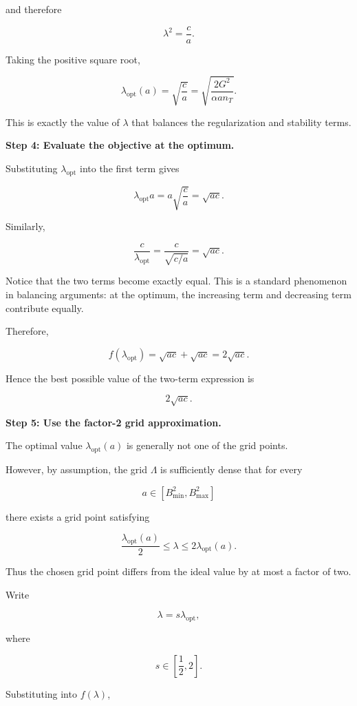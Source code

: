 \documentclass[11pt]{article}
\begin{document}
\begin{enumerate}
\begin{solutionbox}
and therefore

\[
\lambda^2
=
\frac{c}{a}.
\]

Taking the positive square root,

\[
\lambda_{\mathrm{opt}}(a)
=
\sqrt{\frac{c}{a}}
=
\sqrt{
\frac{2G^2}
{\alpha a n_T}
}.
\]

This is exactly the value of $\lambda$ that balances the regularization and stability terms.

\medskip

\textbf{Step 4: Evaluate the objective at the optimum.}

Substituting $\lambda_{\mathrm{opt}}$ into the first term gives

\[
\lambda_{\mathrm{opt}}a
=
a\sqrt{\frac{c}{a}}
=
\sqrt{ac}.
\]

Similarly,

\[
\frac{c}{\lambda_{\mathrm{opt}}}
=
\frac{c}{\sqrt{c/a}}
=
\sqrt{ac}.
\]

Notice that the two terms become exactly equal. This is a standard phenomenon in balancing arguments: at the optimum, the increasing term and decreasing term contribute equally.

Therefore,

\[
f(\lambda_{\mathrm{opt}})
=
\sqrt{ac}
+
\sqrt{ac}
=
2\sqrt{ac}.
\]

Hence the best possible value of the two-term expression is

\[
2\sqrt{ac}.
\]

\medskip

\textbf{Step 5: Use the factor-2 grid approximation.}

The optimal value $\lambda_{\mathrm{opt}}(a)$ is generally not one of the grid points.

However, by assumption, the grid $\Lambda$ is sufficiently dense that for every

\[
a\in[B_{\min}^2,B_{\max}^2]
\]

there exists a grid point satisfying

\[
\frac{\lambda_{\mathrm{opt}}(a)}{2}
\le
\lambda
\le
2\lambda_{\mathrm{opt}}(a).
\]

Thus the chosen grid point differs from the ideal value by at most a factor of two.

Write

\[
\lambda
=
s\lambda_{\mathrm{opt}},
\]

where

\[
s\in\left[\frac12,2\right].
\]

Substituting into $f(\lambda)$,


\end{solutionbox}
\end{enumerate}
\end{document}
